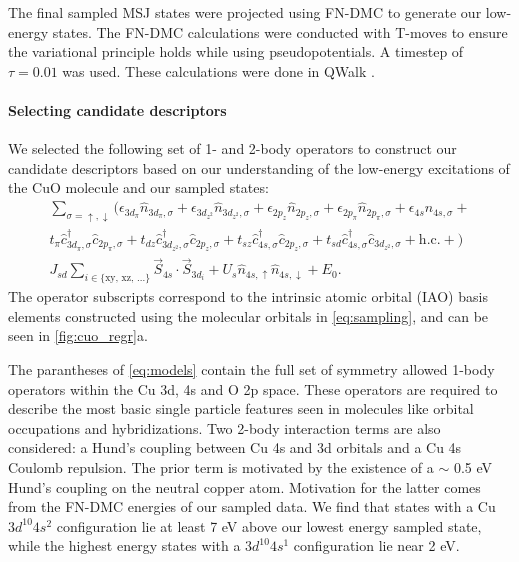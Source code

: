 \documentclass[12pt]{article}
\begin{document}
The final sampled MSJ states were projected using FN-DMC to generate our low-energy states.
The FN-DMC calculations were conducted with T-moves to ensure the variational principle holds while using pseudopotentials.
A timestep of $\tau = 0.01$ was used.
These calculations were done in QWalk \cite{Wagner2009}.

\paragraph{Selecting candidate descriptors}
We selected the following set of 1- and 2-body operators to construct our candidate descriptors based on our understanding of the low-energy excitations of the CuO molecule and our sampled states:
\begin{equation}
\begin{split}
\sum_{\sigma = \uparrow, \downarrow} \Bigg(\epsilon_{3d_\pi}\hat{n}_{3d_\pi,\sigma} + \epsilon_{3d_{z^2}}\hat{n}_{3d_{z^2},\sigma} +  \epsilon_{2p_z} \hat{n}_{2p_z,\sigma} + \epsilon_{2p_\pi}\hat{n}_{2p_\pi,\sigma} + \epsilon_{4s}\hat{n}_{4s,\sigma} +\\
t_\pi \hat{c}_{3d_\pi,\sigma}^\dagger \hat{c}_{2p_\pi,\sigma} + t_{dz} \hat{c}_{3d_{z^2},\sigma}^\dagger \hat{c}_{2p_z,\sigma}  + t_{sz}\hat{c}_{4s,\sigma}^\dagger \hat{c}_{2p_z,\sigma} + t_{sd}\hat{c}_{4s,\sigma}^\dagger \hat{c}_{3d_{z^2},\sigma} + \text{h.c.} + \Bigg)  \\
J_{sd}\sum_{i\in {\{\text{xy, xz, ...}}\}} \vec{S}_{4s} \cdot \vec{S}_{3d_i} + U_s \hat{n}_{4s,\uparrow}\hat{n}_{4s,\downarrow} + E_0.
\end{split}
\label{eq:models}
\end{equation}
The operator subscripts correspond to the intrinsic atomic orbital (IAO) basis elements constructed using the molecular orbitals in \eqref{eq:sampling}, and can be seen in \ref{fig:cuo_regr}a.

The parantheses of \eqref{eq:models} contain the full set of symmetry allowed 1-body operators within the Cu 3d, 4s and O 2p space.
These operators are required to describe the most basic single particle features seen in molecules like orbital occupations and hybridizations.
Two 2-body interaction terms are also considered: a Hund's coupling between Cu 4s and 3d orbitals and a Cu 4s Coulomb repulsion.
The prior term is motivated by the existence of a $\sim $ 0.5 eV Hund's coupling on the neutral copper atom.
Motivation for the latter comes from the FN-DMC energies of our sampled data.
We find that states with a Cu $3d^{10} 4s^{2}$ configuration lie at least 7 eV above our lowest energy sampled state, while the highest energy states with a $3d^{10} 4s^{1}$ configuration lie near 2 eV.
\end{document}
